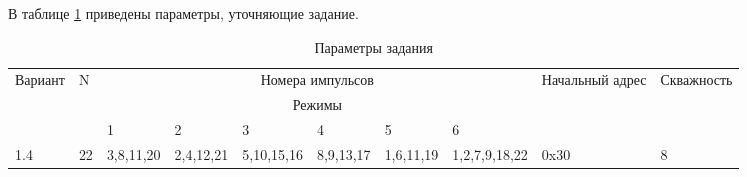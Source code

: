 В таблице \ref{table:task} приведены параметры, уточняющие задание.
\begin{table}[h]
  \centering
  \begin{tabular}{|l|l|l|l|l|l|l|l|p{2cm}|l|}
    \hline
    Вариант & N &  \multicolumn{6}{|c|}{Номера импульсов} & Начальный \newline адрес & Скважность \\ \cline{3-8}
            & & \multicolumn{6}{|c|}{Режимы} & & \\ \cline{3-8}
            & & 1 & 2 & 3 & 4 & 5 & 6 & & \\ \hline 
    1.4 & 22 & 3,8,11,20 & 2,4,12,21 & 5,10,15,16 & 8,9,13,17 & 1,6,11,19 & 1,2,7,9,18,22 & 0x30 & 8 \\ \hline
  \end{tabular}
  \caption{Параметры задания}
  \label{table:task}
\end{table}